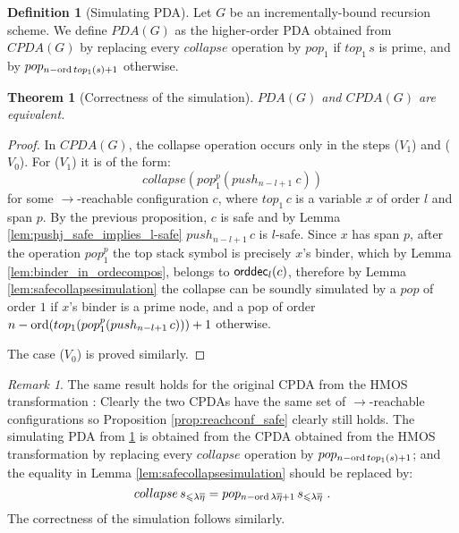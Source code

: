\documentclass[a4paper]{article}[12pt]
\newtheorem{theorem}{Theorem}[section]
\theoremstyle{remark}
\newtheorem{remark}{Remark}[section]
\theoremstyle{definition}
\newtheorem{definition}{Definition}[section]
\newcommand\orddec{{\sf orddec}}
\begin{document}
\begin{definition}[Simulating PDA]
\label{simulating_pda}
Let $G$ be an incrementally-bound recursion scheme.
We define $PDA(G)$ as the higher-order PDA obtained from
$CPDA(G)$ by replacing every $collapse$ operation by $pop_1$ if $top_1\, s$ is prime, and by $pop_{n-\mathop{\mathrm{ord}}{top_1(s)}+1}$ otherwise.
\end{definition}


\begin{theorem}[Correctness of the simulation]
\label{thm:correctness_simulation}
$PDA(G)$ and $CPDA(G)$ are equivalent.
\end{theorem}
\begin{proof}
In $CPDA(G)$, the collapse operation occurs only in the steps ($V_1$) and ($V_0$). For ($V_1$) it is of the form:
$$collapse(pop_1^p(push_{n-l+1}~c))$$
for some $\rightarrow$-reachable configuration $c$, where $top_1\,c$ is a variable $x$ of order $l$ and span $p$.
By the previous proposition, $c$ is safe and by Lemma \ref{lem:pushj_safe_implies_l-safe} $push_{n-l+1}\, c$ is $l$-safe. Since $x$ has span $p$, after the operation $pop_1^p$ the top stack symbol is precisely $x$'s binder, which by Lemma \ref{lem:binder_in_ordecompos}, belongs to $\orddec_l(c)$, therefore
by Lemma \ref{lem:safecollapsesimulation} the collapse can be soundly simulated by a $pop$ of order
$1$ if $x$'s binder is a prime node, and a pop of order $n-\mathop{\mathrm{ord}}(top_1(pop_1^p(push_{n-l+1}\,c))) +1$ otherwise.

The case ($V_0$) is proved similarly.
\end{proof}

\begin{remark}
The same result holds for the original CPDA from the HMOS transformation \cite{hmos-lics08}:
Clearly the two CPDAs have the same set of $\rightarrow$-reachable configurations
so Proposition \ref{prop:reachconf_safe} clearly still holds.
The simulating PDA from \ref{simulating_pda} is obtained from
the CPDA obtained from the HMOS transformation by replacing every $collapse$ operation by $pop_{n-\mathop{\mathrm{ord}}{top_1(s)}+1}$;
and the equality in Lemma \ref{lem:safecollapsesimulation} should be replaced by:
$$collapse\,s_{\leqslant\lambda\overline\eta} = pop_{n-\mathop{\mathrm{ord}} \lambda\overline\eta +1}\,s_{\leqslant\lambda\overline\eta} \ .$$
The correctness of the simulation follows similarly.
\end{remark}
\end{document}
